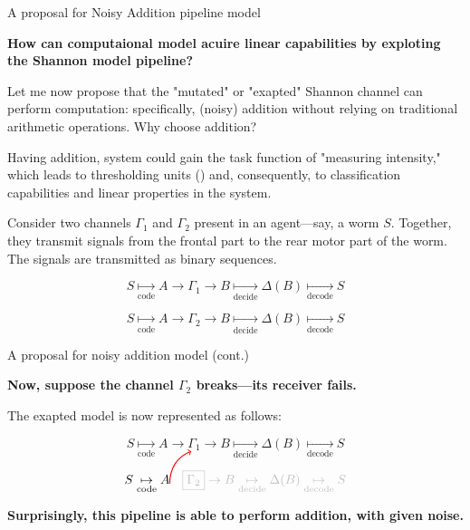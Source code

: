\documentclass[10pt, aspectratio=169]{beamer}
\begin{document}
\begin{frame}{A proposal for Noisy Addition pipeline model }
   
\textbf{How can computaional model acuire linear capabilities by exploting the Shannon model pipeline?}
    
Let me now propose that the "mutated" or "exapted" Shannon channel can perform computation: specifically, (noisy) addition without relying on traditional arithmetic operations. Why choose addition? 

Having addition, system could gain the task function of "measuring intensity," which leads to thresholding units (\cite{mcculloch_logical_1943}) and, consequently, to classification capabilities and linear properties in the system.

Consider two channels \(\Gamma_1\) and \(\Gamma_2\) present in an agent—say, a worm \(S\). Together, they transmit signals from the frontal part to the rear motor part of the worm. The signals are transmitted as binary sequences.


\[
S \underset{\text{code}}{\mapsto} A \rightarrow \boxed{\Gamma_1} \rightarrow B \underset{\text{decide}}{\mapsto} \Delta(B) \underset{\text{decode}}{\mapsto} S
\]

\[
S \underset{\text{code}}{\mapsto} A \rightarrow \boxed{\Gamma_2} \rightarrow B \underset{\text{decide}}{\mapsto} \Delta(B) \underset{\text{decode}}{\mapsto} S
\]

\end{frame}

\begin{frame}{A proposal for noisy addition model (cont.) }

\textbf{Now, suppose the channel \(\Gamma_2\) breaks—its receiver fails.} 

The exapted model is now represented as follows:

\[
S \underset{\text{code}}{\mapsto} A \rightarrow \boxed{\Gamma_1} \rightarrow B \underset{\text{decide}}{\mapsto} \Delta(B) \underset{\text{decode}}{\mapsto} S
\]

\[
S \underset{\text{code}}{\mapsto} 
A 
\begin{tikzpicture}[overlay, remember picture]
    \draw[->, red, thick] (0,0) to[out=90,in=200] (0.6,0.9);
\end{tikzpicture}
\textcolor{white}{\rightarrow }
\textcolor{lightgray}{\boxed{\Gamma_2} \rightarrow B \underset{\text{decide}}{\mapsto} \Delta(B) \underset{\text{decode}}{\mapsto} S}
\]

\textbf{Surprisingly, this pipeline is able to perform addition, with given noise. }

\end{frame}
\end{document}
